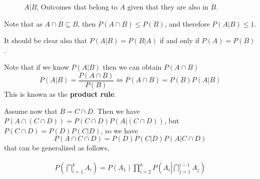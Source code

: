 \documentclass[aspectratio=169]{beamer}
\begin{document}
\begin{frame}
   \begin{figure}
       \centering
        
        \caption{$A | B $, Outcomes that belong to $A$ given that they are also in $B$.}
        
   \end{figure}
\end{frame}

\begin{frame}
    Note that as $A\cap B\subseteq B$, then $P(A\cap B)\leq P(B)$, and therefore $P(A|B)\leq 1$.
    
    \vspace{1cm}
    
     It should be clear also that $P(A|B)=P(B|A)$ if and only if $P(A)=P(B)$.
\end{frame}

\begin{frame}
    Note that if we know $P(A|B)$ then we can obtain $P(A\cap B)$ $$P(A|B)=\frac{P(A\cap B)}{P(B)}\Leftrightarrow P(A\cap B)=P(B)P(A|B)$$ This is known as the \textbf{product rule}.
\end{frame}

\begin{frame}
    Assume now that $B=C\cap D$. Then we have $P(A\cap(C\cap D))=P(C\cap D)P(A|(C\cap D))$, but $P(C\cap D)=P(D)P(C|D)$, so we have $$P(A\cap C\cap D)=P(D)P(C|D)P(A|C\cap D)$$ that can be generalized as follows,
    
    \begin{align*}
        P\left(\bigcap_{i=1}^k A_i\right)= P(A_1)\prod_{i=2}^k P\left(A_i\left|\bigcap_{j=1}^{i-1} A_j\right.\right)
    \end{align*}
\end{frame}
\end{document}
